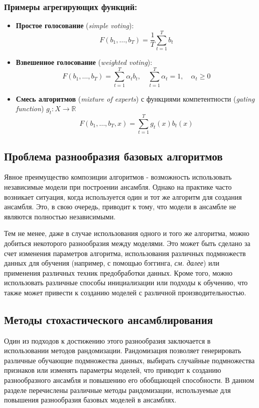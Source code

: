 \subsubsection*{Примеры агрегирующих функций:}
\begin{itemize}
    \item \textbf{Простое голосование} (\textit{simple voting}):
    $$F(b_1, \dots , b_T) = \frac{1}{T} \sum_{t=1}^T b_t$$
    \item \textbf{Взвешенное голосование} (\textit{weighted voting}):
    $$F(b_1, \dots, b_T) = \sum_{t=1}^T \alpha_t b_t, \quad \sum_{t=1}^T \alpha_t = 1, \quad \alpha_t \ge 0$$
    \item \textbf{Смесь алгоритмов} (\textit{mixture of experts}) с функциями компетентности (\textit{gating function}) $g_t: X \to \mathbb{R}$
    $$F(b_1, \dots, b_T, x) = \sum_{t=1}^T g_t(x) b_t(x)$$
\end{itemize}
\subsection{Проблема разнообразия базовых алгоритмов}
Явное преимущество композиции алгоритмов - возможность использовать независимые модели при построении ансамбля. Однако на практике  часто возникает ситуация, когда используется один и тот же алгоритм для создания ансамбля. Это, в свою очередь, приводит к тому, что модели в ансамбле не являются полностью независимыми.

Тем не менее, даже в случае использования одного и того же алгоритма, можно добиться некоторого разнообразия между моделями. Это может быть сделано за счет изменения параметров алгоритма, использования различных подмножеств данных для обучения (например, с помощью бэггинга, \textit{см. далее}) или применения различных техник предобработки данных. Кроме того, можно использовать различные способы инициализации или подходы к обучению, что также может привести к созданию моделей с различной производительностью.

\subsection{Методы стохастического ансамблирования} %
Один из подходов к достижению этого разнообразия заключается в использовании методов рандомизации. Рандомизация позволяет генерировать различные обучающие подмножества данных, выбирать случайные подмножества признаков или изменять параметры моделей, что приводит к созданию разнообразного ансамбля и повышению его обобщающей способности. В данном разделе перечислены различные методы рандомизации, используемые для повышения разнообразия базовых моделей в ансамблях.

